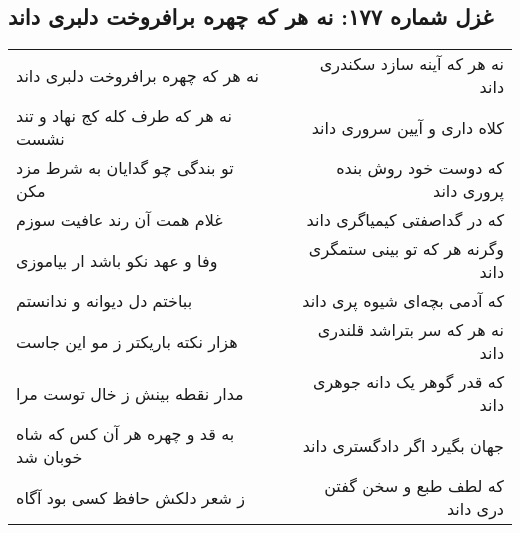 \begin{center}
\section*{غزل شماره ۱۷۷: نه هر که چهره برافروخت دلبری داند}
\label{sec:sh177}
\begin{longtable}{l p{0.5cm} r}
نه هر که چهره برافروخت دلبری داند
&&
نه هر که آینه سازد سکندری داند
\\
نه هر که طرف کله کج نهاد و تند نشست
&&
کلاه داری و آیین سروری داند
\\
تو بندگی چو گدایان به شرط مزد مکن
&&
که دوست خود روش بنده پروری داند
\\
غلام همت آن رند عافیت سوزم
&&
که در گداصفتی کیمیاگری داند
\\
وفا و عهد نکو باشد ار بیاموزی
&&
وگرنه هر که تو بینی ستمگری داند
\\
بباختم دل دیوانه و ندانستم
&&
که آدمی بچه‌ای شیوه پری داند
\\
هزار نکته باریکتر ز مو این جاست
&&
نه هر که سر بتراشد قلندری داند
\\
مدار نقطه بینش ز خال توست مرا
&&
که قدر گوهر یک دانه جوهری داند
\\
به قد و چهره هر آن کس که شاه خوبان شد
&&
جهان بگیرد اگر دادگستری داند
\\
ز شعر دلکش حافظ کسی بود آگاه
&&
که لطف طبع و سخن گفتن دری داند
\\
\end{longtable}
\end{center}
